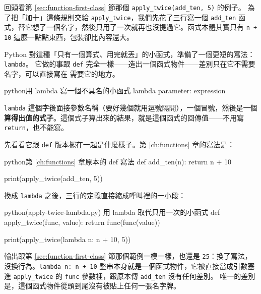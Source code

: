 回頭看第 \ref{sec:function-first-class} 節那個 \texttt{apply\_twice(add\_ten, 5)} 的例子。
為了把「加十」這條規則交給 \texttt{apply\_twice}，我們先花了三行寫一個 \texttt{add\_ten}
函式，替它想了一個名字，然後只用了一次就再也沒提過它。函式本體其實只有 \texttt{n + 10}
這麼一點點東西，包裝卻比內容還大。

Python 對這種「只有一個算式、用完就丟」的小函式，準備了一個更短的寫法：\texttt{lambda}。
它做的事跟 \texttt{def} 完全一樣——造出一個函式物件——差別只在它不需要名字，可以直接寫在
需要它的地方。

\begin{code}{python}{用 lambda 寫一個不具名的小函式}
lambda parameter: expression
\end{code}

\texttt{lambda} 這個字後面接參數名稱（要好幾個就用逗號隔開），一個冒號，然後是一個
\textbf{算得出值的式子}。這個式子算出來的結果，就是這個函式的回傳值——不用寫
\texttt{return}，也不能寫。

先看看它跟 \texttt{def} 版本擺在一起是什麼樣子。第 \ref{ch:functions} 章的寫法是：

\begin{code}{python}{第 \ref{ch:functions} 章原本的 def 寫法}
def add_ten(n):
    return n + 10


print(apply_twice(add_ten, 5))
\end{code}

換成 \texttt{lambda} 之後，三行的定義直接縮成呼叫裡的一小段：

\begin{example}{python}{(apply-twice-lambda.py) 用 lambda 取代只用一次的小函式}
def apply_twice(func, value):
    return func(func(value))


print(apply_twice(lambda n: n + 10, 5))
\end{example}


輸出跟第 \ref{sec:function-first-class} 節那個範例一模一樣，也還是 \texttt{25}：換了寫法，
沒換行為。\texttt{lambda n: n + 10} 整串本身就是一個函式物件，它被直接當成引數塞進
\texttt{apply\_twice} 的 \texttt{func} 參數裡，跟原本傳 \texttt{add\_ten} 沒有任何差別。
唯一的差別是，這個函式物件從頭到尾沒有被貼上任何一張名字牌。



